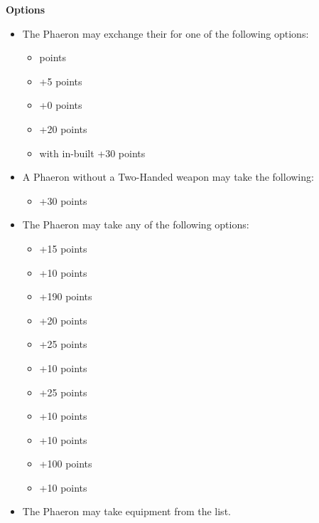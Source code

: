 \begin{minipage}[t]{0.72\textwidth}
	\vspace*{2em}
	\textbf{Options}
	\begin{itemize}
		\item The Phaeron may exchange their  for one of the following options:
		\begin{itemize}			
			\item {}  points
			\item {} \dotfill +5 points
			\item {} \dotfill +0 points
			\item {} \dotfill +20 points
			\item {} with in-built  \dotfill +30 points
		\end{itemize}
		\item A Phaeron without a Two-Handed weapon may take the following:
		\begin{itemize}
			\item {} \dotfill +30 points
		\end{itemize}
		\item The Phaeron may take any of the following options:
		\begin{itemize}
			\item {} \dotfill +15 points
			\item {} \dotfill +10 points
			\item {} \dotfill +190 points
			\item {} \dotfill +20 points
			\item {} \dotfill +25 points
			\item {} \dotfill +10 points
			\item {} \dotfill +25 points
			\item {} \dotfill +10 points
			\item {} \dotfill +10 points
			\item {} \dotfill +100 points
			\item {} \dotfill +10 points
		\end{itemize}
		\item The Phaeron may take equipment from the  list.
	\end{itemize}
\end{minipage}
\hspace{0.5em}

